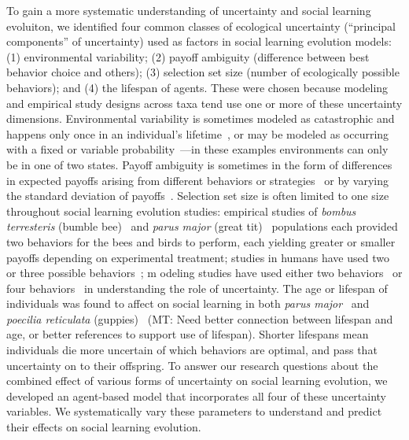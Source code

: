 \documentclass[letterpaper,11.5pt]{scrartcl}
\newcommand{\mt}[1]{{\textcolor{myorange} {({\tiny MT:} #1)}}}
\begin{document}
To gain a more systematic understanding of uncertainty and social learning evoluiton,
we identified four common classes of ecological
uncertainty (``principal components'' of uncertainty) used as factors
in social learning evolution models: (1) environmental variability; (2) payoff
ambiguity (difference between best behavior choice and others); (3) 
selection set size (number of ecologically possible behaviors); and 
(4) the lifespan of agents. These were chosen because modeling and empirical 
study designs across taxa tend use one or more of these uncertainty dimensions.
Environmental variability is sometimes modeled as catastrophic and 
happens only once in an individual's lifetime~\cite{Rogers1988}, or may be
modeled as occurring with a fixed or variable
probability~\cite{Feldman1996,McElreath2005}---in these examples environments
can only be in one of two states. Payoff ambiguity is sometimes in the form
of differences in expected payoffs arising from different
behaviors or strategies~\cite{Enquist2007,Rendell2010}
or by varying the standard deviation of payoffs~\cite{McElreath2005}. 
Selection set size is often limited to one size throughout social learning
evolution studies: empirical studies of \emph{bombus terresteris} (bumble
bee)~\cite{Baracchi2018} and \emph{parus major} (great tit)~\cite{Aplin2017}
populations each provided two behaviors for
the bees and birds to perform, each yielding greater or smaller
payoffs depending on experimental treatment; studies in humans have used two
or three possible behaviors~\cite{McElreath2005,Toyokawa2019}; m
odeling studies have used either two 
behaviors~\cite{Feldman1996,Rendell2010} or four behaviors~\cite{Enquist2007} 
in understanding the role of uncertainty. The age or lifespan of individuals was
found to affect on social learning in both \emph{parus
major}~\cite{Aplin2017} and \emph{poecilia reticulata} 
(guppies)~\cite{Leris2016} \mt{Need better connection between lifespan and 
age, or better references to support use of lifespan}.
Shorter lifespans mean individuals
die more uncertain of which behaviors are optimal, and pass that uncertainty on
to their offspring. To answer our research questions about the combined effect
of various forms of uncertainty on social learning evolution, we developed an
agent-based model that incorporates all four of
these uncertainty variables. We systematically vary these parameters
to understand and predict their effects on social learning evolution.
\end{document}
